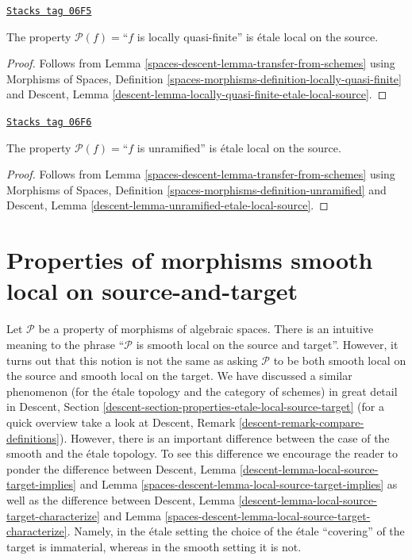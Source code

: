\begin{lemma}
\label{spaces-descent-lemma-locally-quasi-finite-etale-local-source}
\href{https://stacks.math.columbia.edu/tag/06F5}{\texttt{Stacks tag 06F5}}

The property $\mathcal{P}(f)=$``$f$ is locally quasi-finite''
is \'etale local on the source.
\end{lemma}

\begin{proof}
Follows from
Lemma \ref{spaces-descent-lemma-transfer-from-schemes}
using
Morphisms of Spaces,
Definition \ref{spaces-morphisms-definition-locally-quasi-finite}
and
Descent, Lemma \ref{descent-lemma-locally-quasi-finite-etale-local-source}.
\end{proof}

\begin{lemma}
\label{spaces-descent-lemma-unramified-etale-local-source}
\href{https://stacks.math.columbia.edu/tag/06F6}{\texttt{Stacks tag 06F6}}

The property $\mathcal{P}(f)=$``$f$ is unramified''
is \'etale local on the source.
\end{lemma}

\begin{proof}
Follows from
Lemma \ref{spaces-descent-lemma-transfer-from-schemes}
using
Morphisms of Spaces, Definition \ref{spaces-morphisms-definition-unramified}
and
Descent, Lemma \ref{descent-lemma-unramified-etale-local-source}.
\end{proof}

\section{Properties of morphisms smooth local on source-and-target}
\label{spaces-descent-section-properties-local-source-target}
Let $\mathcal{P}$ be a property of morphisms of algebraic spaces. There is an
intuitive meaning to the phrase ``$\mathcal{P}$ is smooth local on the
source and target''. However, it turns out that this notion is not
the same as asking $\mathcal{P}$ to be both smooth
local on the source and smooth local on the target.
We have discussed a similar phenomenon (for the \'etale topology and
the category of schemes) in great detail in
Descent, Section \ref{descent-section-properties-etale-local-source-target}
(for a quick overview take a look at
Descent, Remark \ref{descent-remark-compare-definitions}).
However, there is an important difference between the case of the smooth
and the \'etale topology. To see this difference we encourage the reader
to ponder the difference between
Descent, Lemma \ref{descent-lemma-local-source-target-implies}
and
Lemma \ref{spaces-descent-lemma-local-source-target-implies}
as well as the difference between
Descent, Lemma \ref{descent-lemma-local-source-target-characterize}
and
Lemma \ref{spaces-descent-lemma-local-source-target-characterize}.
Namely, in the \'etale setting the choice of the \'etale ``covering'' of the
target is immaterial, whereas in the smooth setting it is not.

